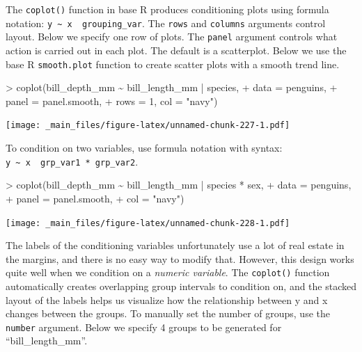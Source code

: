 \documentclass[
]{book}
\newenvironment{Shaded}{\begin{snugshade}}{\end{snugshade}}
\newcommand{\AttributeTok}[1]{\textcolor[rgb]{0.77,0.63,0.00}{#1}}
\newcommand{\DecValTok}[1]{\textcolor[rgb]{0.00,0.00,0.81}{#1}}
\newcommand{\FunctionTok}[1]{\textcolor[rgb]{0.00,0.00,0.00}{#1}}
\newcommand{\NormalTok}[1]{#1}
\newcommand{\SpecialCharTok}[1]{\textcolor[rgb]{0.00,0.00,0.00}{#1}}
\newcommand{\StringTok}[1]{\textcolor[rgb]{0.31,0.60,0.02}{#1}}
\begin{document}
The \texttt{coplot()} function in base R produces conditioning plots using formula notation: \texttt{y\ \textasciitilde{}\ x\ \textbar{}\ grouping\_var}. The \texttt{rows} and \texttt{columns} arguments control layout. Below we specify one row of plots. The \texttt{panel} argument controls what action is carried out in each plot. The default is a scatterplot. Below we use the base R \texttt{smooth.plot} function to create scatter plots with a smooth trend line.

\begin{Shaded}
\begin{Highlighting}[]
\SpecialCharTok{\textgreater{}} \FunctionTok{coplot}\NormalTok{(bill\_depth\_mm }\SpecialCharTok{\textasciitilde{}}\NormalTok{ bill\_length\_mm }\SpecialCharTok{|}\NormalTok{ species, }
\SpecialCharTok{+}        \AttributeTok{data =}\NormalTok{ penguins,}
\SpecialCharTok{+}        \AttributeTok{panel =}\NormalTok{ panel.smooth,}
\SpecialCharTok{+}        \AttributeTok{rows =} \DecValTok{1}\NormalTok{, }\AttributeTok{col =} \StringTok{"navy"}\NormalTok{)}
\end{Highlighting}
\end{Shaded}

\texttt{[image: \_main\_files/figure-latex/unnamed-chunk-227-1.pdf]}

To condition on two variables, use formula notation with syntax: \texttt{y\ \textasciitilde{}\ x\ \textbar{}\ grp\_var1\ *\ grp\_var2}.

\begin{Shaded}
\begin{Highlighting}[]
\SpecialCharTok{\textgreater{}} \FunctionTok{coplot}\NormalTok{(bill\_depth\_mm }\SpecialCharTok{\textasciitilde{}}\NormalTok{ bill\_length\_mm }\SpecialCharTok{|}\NormalTok{ species }\SpecialCharTok{*}\NormalTok{ sex, }
\SpecialCharTok{+}        \AttributeTok{data =}\NormalTok{ penguins,}
\SpecialCharTok{+}        \AttributeTok{panel =}\NormalTok{ panel.smooth,}
\SpecialCharTok{+}        \AttributeTok{col =} \StringTok{"navy"}\NormalTok{)}
\end{Highlighting}
\end{Shaded}

\texttt{[image: \_main\_files/figure-latex/unnamed-chunk-228-1.pdf]}

The labels of the conditioning variables unfortunately use a lot of real estate in the margins, and there is no easy way to modify that. However, this design works quite well when we condition on a \emph{numeric variable}. The \texttt{coplot()} function automatically creates overlapping group intervals to condition on, and the stacked layout of the labels helps us visualize how the relationship between y and x changes between the groups. To manually set the number of groups, use the \texttt{number} argument. Below we specify 4 groups to be generated for ``bill\_length\_mm''.
\end{document}
